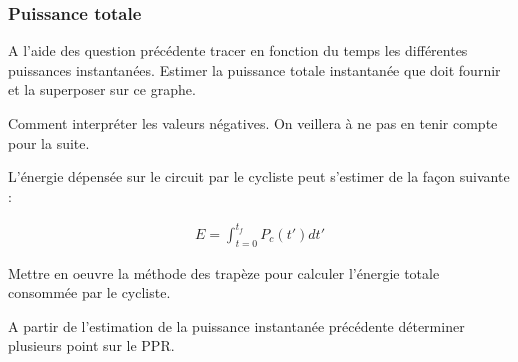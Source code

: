 \subsubsection{Puissance totale}

\question{} A l'aide des question précédente tracer en fonction du temps les différentes puissances instantanées. Estimer la puissance totale instantanée que doit fournir et la superposer sur ce graphe.

\question{} Comment interpréter les valeurs négatives. On veillera à ne pas en tenir compte pour la suite.

L'énergie dépensée sur le circuit par le cycliste peut s'estimer de la façon suivante : 

\begin{align*}
E=\displaystyle{\int_{t=0}^{t_f}P_c(t')dt'}
\end{align*}

\question{} Mettre en oeuvre la méthode des trapèze pour calculer l'énergie totale consommée par le cycliste.




\question{} A partir de l'estimation de la puissance instantanée précédente déterminer plusieurs point sur le PPR.

